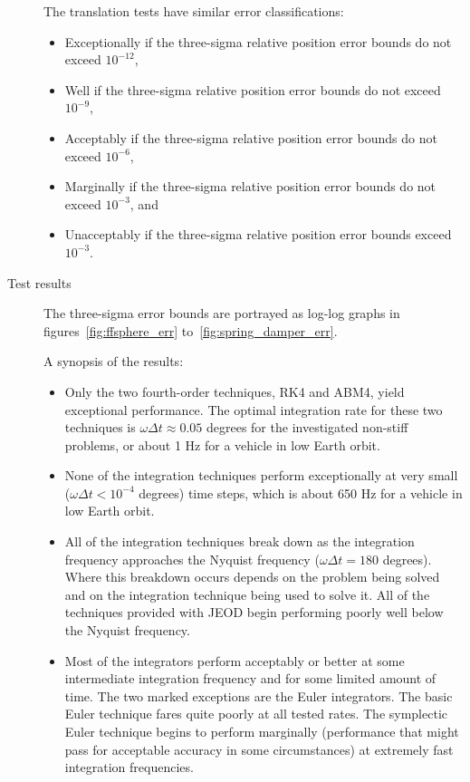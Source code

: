 \begin{description}
The translation tests have similar error classifications:
\begin{itemize}
\item Exceptionally if the three-sigma relative position error bounds
  do not exceed $10^{-12}$,
\item Well if the three-sigma relative position error bounds
  do not exceed $10^{-9}$,
\item Acceptably if the three-sigma relative position error bounds
  do not exceed $10^{-6}$,
\item Marginally if the three-sigma relative position error bounds
  do not exceed $10^{-3}$, and
\item Unacceptably if the three-sigma relative position error bounds
  exceed $10^{-3}$.
\end{itemize}

\item[Test results]
The three-sigma error bounds are portrayed as log-log graphs in
figures~\ref{fig:ffsphere_err} to~\ref{fig:spring_damper_err}.

A synopsis of the results:
\begin{itemize}\vspace{-0.5\baselineskip}
\item Only the two fourth-order techniques, RK4 and ABM4, yield
exceptional performance. The optimal integration rate for these two
techniques is $\omega \Delta t \approx 0.05$ degrees for the investigated
non-stiff problems, or about 1 Hz for a vehicle in low Earth orbit.
\item None of the integration techniques perform exceptionally at 
very small ($\omega \Delta t < 10^{-4}$ degrees) time steps, which
is about 650 Hz for a vehicle in low Earth orbit.
\item All of the integration techniques break down as the 
integration frequency approaches the Nyquist frequency
($\omega \Delta t = 180$ degrees).
Where this breakdown occurs depends on the problem being solved and
on the integration technique being used to solve it.
All of the techniques provided with JEOD begin performing poorly
well below the Nyquist frequency.
\item Most of the integrators perform acceptably or better at some
intermediate integration frequency and for some limited amount of time.
The two marked exceptions are the Euler integrators.
The basic Euler technique fares quite poorly at all tested rates.
The symplectic Euler technique begins to perform marginally
(performance that might pass for acceptable accuracy in some circumstances)
at extremely fast integration frequencies.
\end{itemize}


\end{description}
